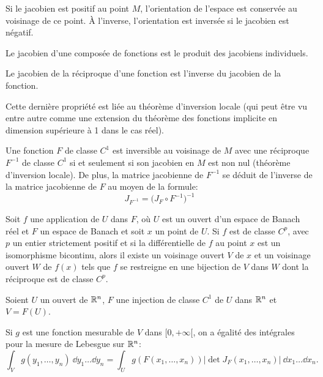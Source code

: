 \medskip
Si le jacobien est positif au point $M$, l'orientation de l'espace est conservée au voisinage de ce point. 
À l'inverse, l'orientation est inversée si le jacobien est négatif.

\medskip
Le jacobien d'une composée de fonctions est le produit des jacobiens individuels.

\medskip
Le jacobien de la réciproque d'une fonction est l'inverse du jacobien de la fonction.

\medskip
{}
Cette dernière propriété est liée au théorème d'inversion locale (qui peut être vu entre autre
comme une extension du théorème des fonctions implicite en dimension supérieure à 1 dans le cas réel).

\medskip
Une fonction $F$ de classe $C^1$ est inversible au voisinage de $M$ avec une réciproque $F^{-1}$ 
de classe $C^1$ si et seulement si son jacobien en $M$ est non nul (théorème d'inversion locale). 
De plus, la matrice jacobienne de $F^{-1}$ se déduit de l'inverse de la matrice jacobienne de $F$ 
au moyen de la formule:
\begin{equation}J_{F^{-1}} = \bigl( J_F \circ F^{-1} \bigr)^{-1}\end{equation}


\begin{theoreme}
Soit $f$ une application de $U$ dans $F$, où $U$ est un ouvert d'un espace de Banach réel et 
$F$ un espace de Banach et soit $x$ un point de $U$.
Si $f$ est de classe $C^p$, avec $p$ un entier strictement positif et si la différentielle de $f$ au point 
$x$ est un isomorphisme bicontinu, alors il existe un voisinage ouvert $V$ de $x$ et un voisinage ouvert 
$W$ de $f(x)$ tels que $f$ se restreigne en une bijection de $V$ dans $W$ dont la réciproque est de 
classe $C^p$.
\end{theoreme}

\medskip
{}

\medskip
\begin{theoreme}

Soient $U$ un ouvert de $\mathbb R^n$, $F$ une injection de classe $C^1$ de $U$ dans $\mathbb R^n$ et $V=F(U)$.

Si $g$ est une fonction mesurable de $V$ dans $[0,+\infty[$, on a égalité des intégrales pour la mesure 
de Lebesgue sur $\mathbb R^n$:
\begin{equation}   \int_V g(y_1,\ldots,y_n)~\dd y_1\ldots\dd y_n = \int_U g\left(F\left(x_1,\ldots,x_n\right)\right) 
\left|\det J_F(x_1,\ldots,x_n)\right|~\dd x_1\ldots\dd x_n.
\end{equation}
\end{theoreme}


